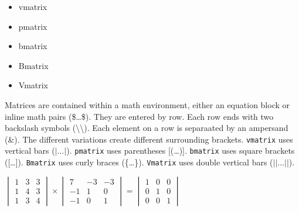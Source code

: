         \begin{framed}
            \begin{itemize}
                \item{vmatrix}
                \item{pmatrix}
                \item{bmatrix}
                \item{Bmatrix}
                \item{Vmatrix}
            \end{itemize}
        \end{framed}

        Matrices are contained within a math environment, either an equation block or inline math pairs (\$\ldots\$). They are entered by row. Each row ends with two backslash symbols (\textbackslash\textbackslash). Each element on a row is separaated by an ampersand (\&). The different variations create different surrounding brackets.
        \texttt{vmatrix} uses vertical bars ($|\ldots|$).
        \texttt{pmatrix} uses parentheses [(\ldots)].
        \texttt{bmatrix} uses square brackets ([\ldots]).
        \texttt{Bmatrix} uses curly braces (\{\ldots\}).
        \texttt{Vmatrix} uses double vertical bars ($||\ldots||$).

        $ \begin{vmatrix}
            1 & 3 & 3 \\
            1 & 4 & 3 \\
            1 & 3 & 4 
        \end{vmatrix}
         \times 
         \begin{vmatrix}
             7 & -3 & -3 \\
             -1 & 1 & 0 \\
             -1 & 0 & 1
         \end{vmatrix}
         =
         \begin{vmatrix}
             1 & 0 & 0 \\
             0 & 1 & 0 \\
             0 & 0 & 1
         \end{vmatrix} $


